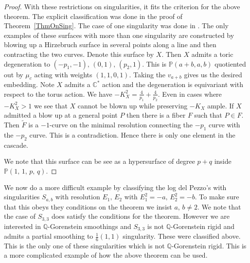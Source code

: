 \documentclass[12pt,a4paper]{book}      %
\theoremstyle{definition}
\newcommand{\ldp}{log del Pezzo}
\newcommand{\mb}[1]{\mathbb{#1}}
\begin{document}
\begin{proof}
With these restrictions on singularities, it fits the criterion for the above theorem. The explicit classification was done in the proof of Theorem~\ref{ThmOnSing}. The case of one singularity was done in \cite{CaveyPrince}. The only examples of these surfaces with more than one singularity are constructed by blowing up a Hirzebruch surface in several points along a line and then contracting the two curves. Denote this surface by $X$. Then $X$ admits a toric degeneration to $(-p_1, -1), \, (0, 1), \, (p_2, 1)$. This is $\mb{P}(a+b, a, b)$ quotiented out by $\mu_c$ acting with weights $(1,1,0,1)$. Taking the $v_{a+b}$ gives us the desired embedding. Note $X$ admits a $\mb{C}^*$ action and the degeneration is equivariant with respect to the torus action. We have $-K_X^2 = \frac{4}{p_1} + \frac{4}{p_2}$. Even in cases where $-K_X^2 > 1$ we see that $X$ cannot be blown up while preserving $-K_X$ ample. If $X$ admitted a blow up at a general point $P$ then there is a fiber $F$ such that $P \in F$. Then $\widetilde F$ is a $-1$-curve on the minimal resolution connecting the $-p_1$ curve with the $-p_2$ curve. This is a contradiction. Hence there is only one element in the cascade.



We note that this surface can be see as a hypersurface of degree $p+q$ inside $\mb{P}(1,\,1,\,p,\,q)$.

\end{proof}
We now do a more difficult example by classifying the \ldp's with singularities $S_{a,b}$ with resolution $E_1, \, E_2$ with $E_1^2 = -a,\, E_2^2 = -b$. To make sure that this obeys they conditions on the theorem we insist $a, \, b \neq 2$. We note that the case of $S_{3,3}$ does satisfy the conditions for the theorem. However we are interested in $\mb{Q}$-Gorenstein smoothings and $S_{3,3}$ is not $\mb{Q}$-Gorenstein rigid and admits a partial smoothing to $\frac{1}{6}(1,1)$ singularity. These were classified above. This is the only one of these singularities which is not $\mb{Q}$-Gorenstein rigid. This is a more complicated example of how the above theorem can be used.
\end{document}
